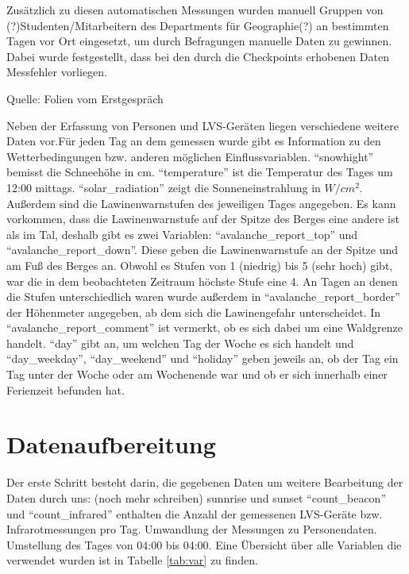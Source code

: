 \documentclass[12pt]{scrreprt}
\begin{document}
	Zusätzlich zu diesen automatischen Messungen wurden manuell Gruppen von (?)Studenten/Mitarbeitern des Departments für Geographie(?) an bestimmten Tagen vor Ort eingesetzt, um durch Befragungen manuelle Daten zu gewinnen. Dabei wurde festgestellt, dass bei den durch die Checkpoints erhobenen Daten Messfehler vorliegen.
	
	Quelle:
	Folien vom Erstgespräch
	
	Neben der Erfassung von Personen und LVS-Geräten liegen verschiedene weitere Daten vor.Für jeden Tag an dem gemessen wurde gibt es Information zu den Wetterbedingungen bzw. anderen möglichen Einflussvariablen. "`snowhight"' bemisst die Schneehöhe in cm. "`temperature"' ist die Temperatur des Tages um 12:00 mittags. "`solar\_radiation"' zeigt die Sonneneinstrahlung in $W/cm^2$. Außerdem sind die Lawinenwarnstufen des jeweiligen Tages angegeben. Es kann vorkommen, dass die Lawinenwarnstufe auf der Spitze des Berges eine andere ist als im Tal, deshalb gibt es zwei Variablen: "`avalanche\_report\_top"' und "`avalanche\_report\_down"'. Diese geben die Lawinenwarnstufe an der Spitze und am Fuß des Berges an. Obwohl es Stufen von 1 (niedrig) bis 5 (sehr hoch) gibt, war die in dem beobachteten Zeitraum höchste Stufe eine 4. An Tagen an denen die Stufen unterschiedlich waren wurde außerdem in "`avalanche\_report\_border"' der Höhenmeter angegeben, ab dem sich die Lawinengefahr unterscheidet. In "`avalanche\_report\_comment"' ist vermerkt, ob es sich dabei um eine Waldgrenze handelt. "`day"' gibt an, um welchen Tag der Woche es sich handelt und "`day\_weekday"', "`day\_weekend"' und "`holiday"' geben jeweils an, ob der Tag ein Tag unter der Woche oder am Wochenende war und ob er sich innerhalb einer Ferienzeit befunden hat.
	
	\section{Datenaufbereitung}
	Der erste Schritt besteht darin, die gegebenen Daten um weitere 
	Bearbeitung der Daten durch uns:
	(noch mehr schreiben)
	sunnrise und sunset
	"`count\_beacon"' und "`count\_infrared"' enthalten die Anzahl der gemessenen LVS-Geräte bzw. Infrarotmessungen pro Tag.
	Umwandlung der Messungen zu Personendaten. Umstellung des Tages von 04:00 bis 04:00.
	Eine Übersicht über alle Variablen die verwendet wurden ist in Tabelle  \ref{tab:var} zu finden.
	
\end{document}
